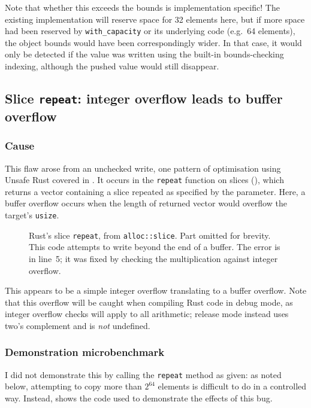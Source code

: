 \documentclass[dissertation.tex]{subfiles}
\begin{document}
Note that whether this exceeds the bounds is implementation specific!
The existing implementation will reserve space for 32 elements here, but
if more space had been reserved by \texttt{with\_capacity} or its
underlying code (e.g.\ 64 elements), the object bounds would have been
correspondingly wider.
In that case, it would only be detected if the value was written using
the built-in bounds-checking indexing, although the pushed value would
still disappear.


\subsection{Slice \texttt{repeat}: integer overflow leads to buffer overflow}
\label{sec:eval-micro-repeat}

\subsubsection{Cause}
This flaw arose from an unchecked write, one pattern of optimisation
using Unsafe Rust covered in .
It occurs in the \texttt{repeat} function on slices
(), which returns a vector containing a slice
repeated as specified by the parameter.
Here, a buffer overflow occurs when the length of returned vector would
overflow the target's \texttt{usize}.

\begin{figure}[ht]
    
    \caption{
        Rust's slice \texttt{repeat}, from \texttt{alloc::slice}.
        Part omitted for brevity.
        This code attempts to write beyond the end of a buffer.
        The error is in line~5; it was fixed by checking the
        multiplication against integer overflow.
    }
    \label{lst:slice-repeat}
\end{figure}

This appears to be a simple integer overflow translating to a buffer
overflow.
Note that this overflow will be caught when compiling Rust code in debug
mode, as integer overflow checks will apply to all arithmetic; release
mode instead uses two's complement and is \emph{not} undefined.

\subsubsection{Demonstration microbenchmark}
I did not demonstrate this by calling the \texttt{repeat} method as
given: as noted below, attempting to copy more than \(2^{64}\) elements
is difficult to do in a controlled way.
Instead,  shows the code used to demonstrate the
effects of this bug.
\end{document}
